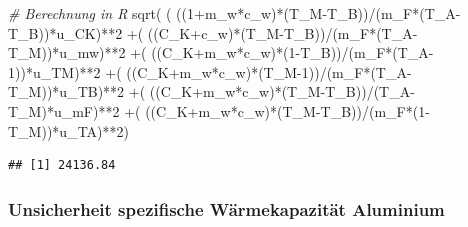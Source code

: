 \documentclass[class=article, crop=false]{standalone}
\newenvironment{Shaded}{\begin{snugshade}}{\end{snugshade}}
\newcommand{\CommentTok}[1]{\textcolor[rgb]{0.56,0.35,0.01}{\textit{#1}}}
\newcommand{\DecValTok}[1]{\textcolor[rgb]{0.00,0.00,0.81}{#1}}
\newcommand{\FunctionTok}[1]{\textcolor[rgb]{0.00,0.00,0.00}{#1}}
\newcommand{\NormalTok}[1]{#1}
\newcommand{\SpecialCharTok}[1]{\textcolor[rgb]{0.00,0.00,0.00}{#1}}
\begin{document}
\begin{Shaded}
\begin{Highlighting}[]
\CommentTok{\# Berechnung in R}
\FunctionTok{sqrt}\NormalTok{( ( ((}\DecValTok{1}\SpecialCharTok{+}\NormalTok{m\_w}\SpecialCharTok{*}\NormalTok{c\_w)}\SpecialCharTok{*}\NormalTok{(T\_M}\SpecialCharTok{{-}}\NormalTok{T\_B))}\SpecialCharTok{/}\NormalTok{(m\_F}\SpecialCharTok{*}\NormalTok{(T\_A}\SpecialCharTok{{-}}\NormalTok{T\_B))}\SpecialCharTok{*}\NormalTok{u\_CK)}\SpecialCharTok{**}\DecValTok{2}
     \SpecialCharTok{+}\NormalTok{( ((C\_K}\SpecialCharTok{+}\NormalTok{c\_w)}\SpecialCharTok{*}\NormalTok{(T\_M}\SpecialCharTok{{-}}\NormalTok{T\_B))}\SpecialCharTok{/}\NormalTok{(m\_F}\SpecialCharTok{*}\NormalTok{(T\_A}\SpecialCharTok{{-}}\NormalTok{T\_M))}\SpecialCharTok{*}\NormalTok{u\_mw)}\SpecialCharTok{**}\DecValTok{2}
     \SpecialCharTok{+}\NormalTok{( ((C\_K}\SpecialCharTok{+}\NormalTok{m\_w}\SpecialCharTok{*}\NormalTok{c\_w)}\SpecialCharTok{*}\NormalTok{(}\DecValTok{1}\SpecialCharTok{{-}}\NormalTok{T\_B))}\SpecialCharTok{/}\NormalTok{(m\_F}\SpecialCharTok{*}\NormalTok{(T\_A}\DecValTok{{-}1}\NormalTok{))}\SpecialCharTok{*}\NormalTok{u\_TM)}\SpecialCharTok{**}\DecValTok{2}
     \SpecialCharTok{+}\NormalTok{( ((C\_K}\SpecialCharTok{+}\NormalTok{m\_w}\SpecialCharTok{*}\NormalTok{c\_w)}\SpecialCharTok{*}\NormalTok{(T\_M}\DecValTok{{-}1}\NormalTok{))}\SpecialCharTok{/}\NormalTok{(m\_F}\SpecialCharTok{*}\NormalTok{(T\_A}\SpecialCharTok{{-}}\NormalTok{T\_M))}\SpecialCharTok{*}\NormalTok{u\_TB)}\SpecialCharTok{**}\DecValTok{2}
     \SpecialCharTok{+}\NormalTok{( ((C\_K}\SpecialCharTok{+}\NormalTok{m\_w}\SpecialCharTok{*}\NormalTok{c\_w)}\SpecialCharTok{*}\NormalTok{(T\_M}\SpecialCharTok{{-}}\NormalTok{T\_B))}\SpecialCharTok{/}\NormalTok{(T\_A}\SpecialCharTok{{-}}\NormalTok{T\_M)}\SpecialCharTok{*}\NormalTok{u\_mF)}\SpecialCharTok{**}\DecValTok{2}
     \SpecialCharTok{+}\NormalTok{( ((C\_K}\SpecialCharTok{+}\NormalTok{m\_w}\SpecialCharTok{*}\NormalTok{c\_w)}\SpecialCharTok{*}\NormalTok{(T\_M}\SpecialCharTok{{-}}\NormalTok{T\_B))}\SpecialCharTok{/}\NormalTok{(m\_F}\SpecialCharTok{*}\NormalTok{(}\DecValTok{1}\SpecialCharTok{{-}}\NormalTok{T\_M))}\SpecialCharTok{*}\NormalTok{u\_TA)}\SpecialCharTok{**}\DecValTok{2}\NormalTok{)}
\end{Highlighting}
\end{Shaded}

\begin{verbatim}
## [1] 24136.84
\end{verbatim}

\hypertarget{unsicherheit-spezifische-wuxe4rmekapazituxe4t-aluminium}{%
\subsubsection{Unsicherheit spezifische Wärmekapazität
Aluminium}\label{unsicherheit-spezifische-wuxe4rmekapazituxe4t-aluminium}}
\end{document}
